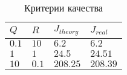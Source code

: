 \begin{table}[h!]
        \centering
        \begin{tabular}{| l | l | l | l |} 
            \hline
            $Q$ & $R$ & $J_{theory}$ & $J_{real}$  \\  
            \hline
            $0.1$ & $10$ & $6.2$ & $6.2$  \\  
            $1$ & $1$ & $24.5$ & $24.51$  \\  
            $10$ & $0.1$ & $208.25$ & $208.39$  \\  
        \end{tabular}
        \caption{Критерии качества}
        \label{table:task1}
    \end{table}






\FloatBarrier